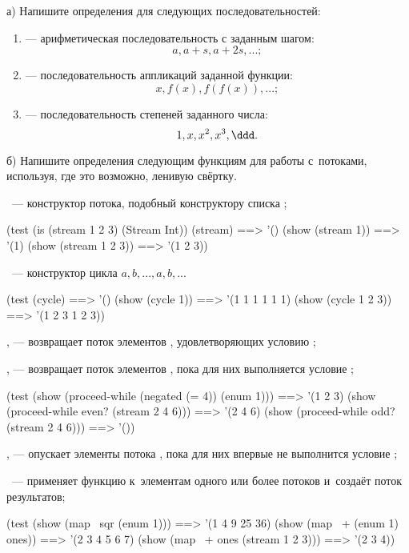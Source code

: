 \begin{Assignment}
а) Напишите определения для следующих последовательностей:
\begin{enumerate}
\item {} --- арифметическая последовательность с заданным шагом: $$a, a+s, a+2s, ...;$$
\item \label{iteration} --- последовательность аппликаций заданной функции: $$x, f(x), f(f(x)), ...;$$
\item {} --- последовательность степеней заданного числа: $$1, x, x^2 , x^3, \ddd .$$
\end{enumerate}


б) Напишите определения следующим функциям для работы с~потоками, используя, где это возможно, ленивую свёртку.

~--- конструктор потока, подобный конструктору списка ;
\begin{Specification}
(test 
  (is (stream 1 2 3) (Stream Int))
  (stream)              ==> '()
  (show (stream 1))     ==> '(1)
  (show (stream 1 2 3)) ==> '(1 2 3))
\end{Specification}

~--- конструктор цикла $a,b,...,a, b,...$
\begin{Specification}
(test 
  (cycle)              ==> '()
  (show (cycle 1))     ==> '(1 1 1 1 1 1)
  (show (cycle 1 2 3)) ==> '(1 2 3 1 2 3))
\end{Specification}


\label{lazy-filter}, --- возвращает поток элементов , удовлетворяющих условию ;

\label{until}, --- возвращает поток элементов , пока для них выполняется условие ;

\begin{Specification}
(test
  (show (proceed-while (negated (= 4)) (enum 1))) ==> '(1 2 3)
  (show (proceed-while even? (stream 2 4 6)))     ==> '(2 4 6)
  (show (proceed-while odd? (stream 2 4 6)))      ==> '())
\end{Specification}

\label{skip-until}, --- опускает элементы потока , пока для них впервые не выполнится условие ;

~--- применяет функцию  к~элементам одного или более потоков и~создаёт поток результатов;

\begin{Specification}
(test
  (show (map~ sqr (enum 1)))          ==> '(1 4 9 25 36)
  (show (map~ + (enum 1) ones))       ==> '(2 3 4 5 6 7)
  (show (map~ + ones (stream 1 2 3))) ==> '(2 3 4))
\end{Specification}
\end{Assignment}

